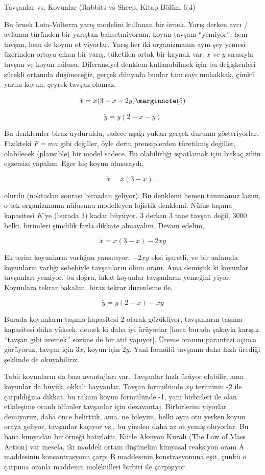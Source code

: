 \documentclass[12pt,fleqn]{article}\usepackage{../../common}
\begin{document}
Tavşanlar vs. Koyunlar (Rabbits vs Sheep, Kitap Bölüm 6.4)

Bu örnek Lota-Volterra yarış modelini kullanan bir örnek. Yarış derken avcı /
avlanan türünden bir yarıştan bahsetmiyorum, koyun tavşanı ``yemiyor'', hem
tavşan, hem de koyun ot yiyorlar. Yarış her iki organizmanın aynı şey yemesi
üzerinden ortaya çıkan bir yarış, tüketilen ortak bir kaynak var. $x$ ve $y$
sırasıyla tavşan ve koyun nüfusu. Diferansiyel denklem kullanabilmek için bu
değişkenleri sürekli ortamda düşüneceğiz, gerçek dünyada bunlar tam sayı
muhakkak, çünkü yarım koyun, çeyrek tavşan olamaz.

$$ 
\dot{x} = x(3-x-2y) 
\mlabel{5} 
$$

$$ \dot{y} = y(2-x-y) $$

Bu denklemler biraz uyduruldu, sadece aşağı yukarı gerçek durumu
gösteriyorlar. Fizikteki $F=ma$ gibi değiller, öyle derin prensiplerden
türetilmiş değiller, olabilecek (plausible) bir model sadece. Bu olabilirliği
ispatlamak için birkaç zihin egzersizi yapalım. Eğer hiç koyun olmasaydı,

$$ \dot{x} = x(3-x) ...$$

olurdu (noktadan sonrası birazdan geliyor). Bu denklemi hemen tanımamız lazım, o
tek organizmanın nüfusunu modelleyen lojistik denklemi. Nüfus taşıma kapasitesi
$K$'ye (burada 3) kadar büyüyor. 3 derken 3 tane tavşan değil, 3000 belki,
birimleri şimdilik fazla dikkate almayalım. Devam edelim, 

$$ \dot{x} = x(3-x) - 2xy$$

Ek terim koyunların varlığını yansıtıyor, $-2xy$ eksi işaretli, ve bir anlamda
koyunların varlığı sebebiyle tavşanların ölüm oranı. Ama demiştik ki koyunlar
tavşanları yemiyor, bu doğru, fakat koyunlar tavşanların yemeğini
yiyor. Koyunlara tekrar bakalım, biraz tekrar düzenleme ile,

$$ \dot{y} = y(2-x) - xy $$

Burada koyunların taşıma kapasitesi 2 olarak gözüküyor, tavşanların taşıma
kapasitesi daha yüksek, demek ki daha iyi ürüyorlar [hoca burada şakayla karışık
  ``tavşan gibi üremek'' sözüne de bir atıf yapıyor]. Üreme oranını parantezi
açınca görüyoruz, tavşan için $3x$, koyun için $2y$. Yani formülü tavşanın daha
hızlı ürediği şeklinde de okuyabiliriz. 

Tabii koyunların da bazı avantajları var. Tavşanlar hızlı ürüyor olabilir, ama
koyunlar da büyük, okkalı hayvanlar. Tavşan formülünde $xy$ teriminin -2 ile
çarpıldığına dikkat, bu rakam koyun formülünde -1, yani birbirleri ile olan
etkileşime oranlı ölümler tavşanlar için dezavantaj. Birbirlerini yiyorlar
demiyoruz, daha önce belirttik, ama, ne bileyim, belki aynı otu yerken koyun
oraya geliyor, tavşanlar kaçıyor vs., bu yüzden daha az ot yemiş oluyorlar. Bu
bana kimyadan bir örneği hatırlattı, Kütle Aksiyon Kuralı (The Law of Mass
Action) var mesela, iki maddeli ortam düşünelim kimyasal reaksiyon oranı A
maddesinin konsantrasyonu çarpı B maddesinin konstrasyonuna eşit, çünkü o
çarpıma oranla maddenin molekülleri  birbiri ile çarpışıyor. 
\end{document}
